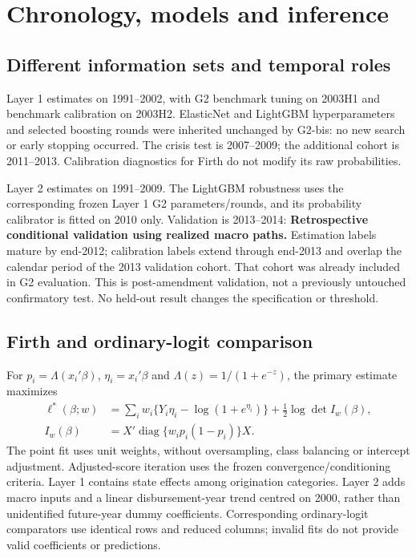 \section{Chronology, models and inference}
\subsection{Different information sets and temporal roles}
Layer 1 estimates on 1991--2002, with G2 benchmark tuning on 2003H1 and benchmark calibration on 2003H2. ElasticNet and LightGBM hyperparameters and selected boosting rounds were inherited unchanged by G2-bis: no new search or early stopping occurred. The crisis test is 2007--2009; the additional cohort is 2011--2013. Calibration diagnostics for Firth do not modify its raw probabilities.

Layer 2 estimates on 1991--2009. The LightGBM robustness uses the corresponding frozen Layer 1 G2 parameters/rounds, and its probability calibrator is fitted on 2010 only. Validation is 2013--2014: \textbf{Retrospective conditional validation using realized macro paths.} Estimation labels mature by end-2012; calibration labels extend through end-2013 and overlap the calendar period of the 2013 validation cohort. That cohort was already included in G2 evaluation. This is post-amendment validation, not a previously untouched confirmatory test. No held-out result changes the specification or threshold.

\subsection{Firth and ordinary-logit comparison}
For $p_i=\Lambda(x_i'\beta)$, $\eta_i=x_i'\beta$ and $\Lambda(z)=1/(1+e^{-z})$, the primary estimate maximizes
\begin{align*}
\ell^*(\beta;w)&=\sum_iw_i\{Y_i\eta_i-\log(1+e^{\eta_i})\}+\tfrac12\log\det I_w(\beta),\\
I_w(\beta)&=X'\operatorname{diag}\{w_ip_i(1-p_i)\}X.
\end{align*}
The point fit uses unit weights, without oversampling, class balancing or intercept adjustment. Adjusted-score iteration uses the frozen convergence/conditioning criteria. Layer 1 contains state effects among origination categories. Layer 2 adds macro inputs and a linear disbursement-year trend centred on 2000, rather than unidentified future-year dummy coefficients. Corresponding ordinary-logit comparators use identical rows and reduced columns; invalid fits do not provide valid coefficients or predictions.

